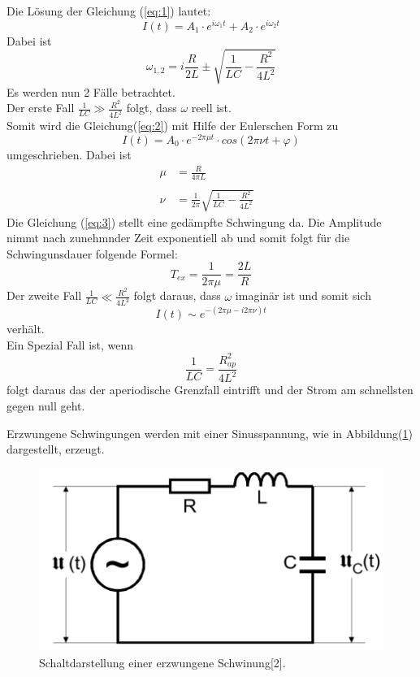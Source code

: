 Die Lösung der Gleichung (\ref{eq:1}) lautet:
\begin{equation}
  I(t) = A_1 \cdot e^{i\omega_1 t} + A_2 \cdot e^{i\omega_2 t}
  \label{eq:2}
\end{equation}
Dabei ist
\begin{equation*}
  \omega_{1,2} =  i \frac{R}{2L} \pm \sqrt{\frac{1}{LC} - \frac{R^2}{4L^2}}
\end{equation*}
Es werden nun 2 Fälle betrachtet.\\
Der erste Fall $\frac{1}{LC} \gg \frac{R^2}{4L^2}$ folgt, dass $\omega$ reell ist.\\
Somit wird die Gleichung(\ref{eq:2}) mit Hilfe der Eulerschen Form zu
\begin{equation}
  I(t) = A_0 \cdot e^{-2\pi\mu t} \cdot cos(2\pi\nu t + \varphi)
  \label{eq:3}
\end{equation}
umgeschrieben. Dabei ist
\begin{align*}
    \mu &= \frac{R}{4\pi L}& \\\\
    \nu &= \frac{1}{2\pi} \sqrt{\frac{1}{LC} - \frac{R^2}{4L^2}}&
\end{align*}
Die Gleichung (\ref{eq:3}) stellt eine gedämpfte Schwingung da. Die Amplitude nimmt nach zunehmnder Zeit exponentiell ab
und somit folgt für die Schwingunsdauer folgende Formel:
\begin{equation}
  T_{ex} = \frac{1}{2\pi \mu} = \frac{2L}{R}
  \label{eq:4}
\end{equation}
Der zweite Fall $\frac{1}{LC} \ll \frac{R^2}{4L^2}$ folgt daraus, dass $\omega$ imaginär ist
und somit sich
\begin{equation*}
I(t) \sim e^{-(2\pi \mu - i 2 \pi \nu)t}
\end{equation*} verhält.\\
Ein Spezial Fall ist, wenn
\begin{equation}
\frac{1}{LC} = \frac{R_{ap}^2}{4L^2}
\label{eq:5}
\end{equation}
folgt daraus das der aperiodische Grenzfall eintrifft und der Strom am schnellsten gegen null geht.

\newpage
Erzwungene Schwingungen werden mit einer Sinusspannung, wie in Abbildung(\ref{fig:2}) dargestellt, erzeugt.
\begin{figure}[H]
\centering
\includegraphics[width=10 cm, height= 7 cm]{Schwingkreis2.png}
\caption{Schaltdarstellung einer erzwungene Schwinung[2].}
\label{fig:2}
\end{figure}

